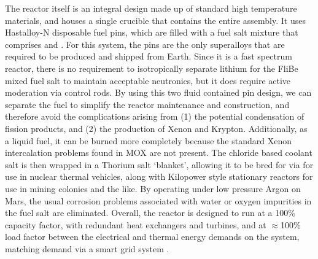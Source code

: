 \documentclass[fleqn,10pt]{Stylesheet} %
\begin{document}
The reactor itself is an integral design made up of standard high temperature materials, and houses a single crucible that contains the entire assembly. It uses Hastalloy-N disposable fuel pins, which are filled with a fuel salt mixture that comprises  and . For this system, the pins are the only superalloys that are required to be produced and shipped from Earth. Since it is a fast spectrum reactor, there is no requirement to isotropically separate lithium for the FliBe mixed fuel salt to maintain acceptable neutronics, but it does require active moderation via control rods. By using this two fluid contained pin design, we can separate the fuel to simplify the reactor maintenance and construction, and therefore avoid the complications arising from (1) the potential condensation of fission products, and (2) the production of Xenon and Krypton. Additionally, as a liquid fuel, it can be burned more completely because the standard Xenon intercalation problems found in MOX are not present. The chloride based coolant salt is then wrapped in a Thorium salt `blanket', allowing it to be bred for  via  for use in nuclear thermal vehicles, along with Kilopower style stationary reactors for use in mining colonies and the like. By operating under low pressure Argon on Mars, the usual corrosion problems associated with water or oxygen impurities in the fuel salt are eliminated. Overall, the reactor is designed to run at a 100\% capacity factor, with redundant heat exchangers and turbines, and at $\approx$100\% load factor between the electrical and thermal energy demands on the system, matching demand via a smart grid system \cite{Shultis2016}. 
\end{document}

